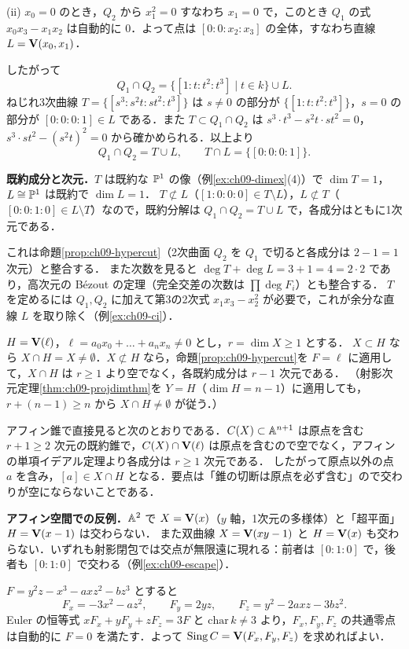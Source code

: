 (ii) $x_0=0$ のとき，$Q_2$ から $x_1^2=0$ すなわち $x_1=0$ で，このとき $Q_1$ の式 $x_0x_3-x_1x_2$ は自動的に $0$．よって点は $[0:0:x_2:x_3]$ の全体，すなわち直線 $L=\mathbf{V}(x_0,x_1)$．

したがって
\[
  Q_1\cap Q_2=\{[1:t:t^2:t^3]\mid t\in k\}\cup L .
\]
ねじれ3次曲線 $T=\{[s^3:s^2t:st^2:t^3]\}$ は $s\neq0$ の部分が $\{[1:t:t^2:t^3]\}$，$s=0$ の部分が $[0:0:0:1]\in L$ である．また $T\subset Q_1\cap Q_2$ は $s^3\cdot t^3-s^2t\cdot st^2=0$，$s^3\cdot st^2-(s^2t)^2=0$ から確かめられる．以上より
\[
  Q_1\cap Q_2=T\cup L,\qquad T\cap L=\{[0:0:0:1]\}.
\]

\textbf{既約成分と次元．}$T$ は既約な $\mathbb{P}^1$ の像（例\ref{ex:ch09-dimex}(4)）で $\dim T=1$，$L\cong\mathbb{P}^1$ は既約で $\dim L=1$．
$T\not\subset L$（$[1:0:0:0]\in T\setminus L$），$L\not\subset T$（$[0:0:1:0]\in L\setminus T$）なので，既約分解は $Q_1\cap Q_2=T\cup L$ で，各成分はともに1次元である．

これは命題\ref{prop:ch09-hypercut}（2次曲面 $Q_2$ を $Q_1$ で切ると各成分は $2-1=1$ 次元）と整合する．
また次数を見ると $\deg T+\deg L=3+1=4=2\cdot2$ であり，高次元の B\'ezout の定理（完全交差の次数は $\prod\deg F_i$）とも整合する．
$T$ を定めるには $Q_1,Q_2$ に加えて第3の2次式 $x_1x_3-x_2^2$ が必要で，これが余分な直線 $L$ を取り除く（例\ref{ex:ch09-ci}）．

$H=\mathbf{V}(\ell)$，$\ell=a_0x_0+\dots+a_nx_n\neq0$ とし，$r=\dim X\ge1$ とする．
$X\subset H$ なら $X\cap H=X\neq\emptyset$．$X\not\subset H$ なら，命題\ref{prop:ch09-hypercut}を $F=\ell$ に適用して，$X\cap H$ は $r\ge1$ より空でなく，各既約成分は $r-1$ 次元である．
（射影次元定理\ref{thm:ch09-projdimthm}を $Y=H$（$\dim H=n-1$）に適用しても，$r+(n-1)\ge n$ から $X\cap H\neq\emptyset$ が従う．）

アフィン錐で直接見ると次のとおりである．$C(X)\subset\mathbb{A}^{n+1}$ は原点を含む $r+1\ge2$ 次元の既約錐で，$C(X)\cap\mathbf{V}(\ell)$ は原点を含むので空でなく，アフィンの単項イデアル定理より各成分は $r\ge1$ 次元である．
したがって原点以外の点 $a$ を含み，$[a]\in X\cap H$ となる．要点は「錐の切断は原点を必ず含む」ので交わりが空にならないことである．

\textbf{アフィン空間での反例．}$\mathbb{A}^2$ で $X=\mathbf{V}(x)$（$y$ 軸，1次元の多様体）と「超平面」$H=\mathbf{V}(x-1)$ は交わらない．
また双曲線 $X=\mathbf{V}(xy-1)$ と $H=\mathbf{V}(x)$ も交わらない．いずれも射影閉包では交点が無限遠に現れる：前者は $[0:1:0]$ で，後者も $[0:1:0]$ で交わる（例\ref{ex:ch09-escape}）．

$F=y^2z-x^3-axz^2-bz^3$ とすると
\[
  F_x=-3x^2-az^2,\qquad F_y=2yz,\qquad F_z=y^2-2axz-3bz^2.
\]
Euler の恒等式 $xF_x+yF_y+zF_z=3F$ と $\mathrm{char}\,k\neq3$ より，$F_x,F_y,F_z$ の共通零点は自動的に $F=0$ を満たす．よって $\operatorname{Sing} C=\mathbf{V}(F_x,F_y,F_z)$ を求めればよい．

